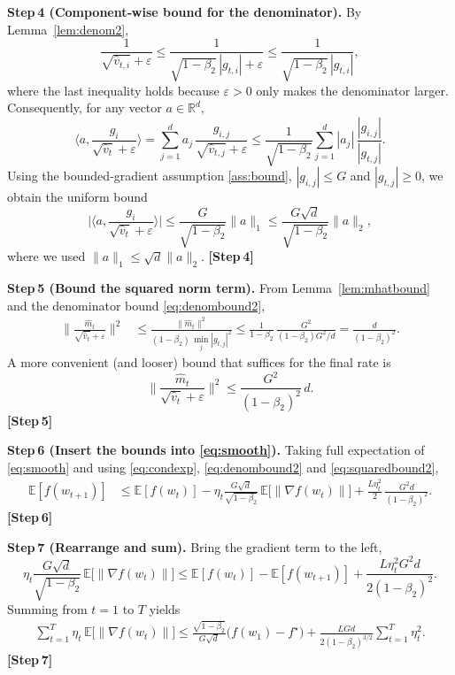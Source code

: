 \documentclass{article}
\begin{document}
\noindent\textbf{Step 4 (Component‑wise bound for the denominator).}  
By Lemma~\ref{lem:denom2},
\[
\frac{1}{\sqrt{\hat v_{t,i}}+\varepsilon}
\le \frac{1}{\sqrt{1-\beta_2}\,|g_{t,i}|+\varepsilon}
\le \frac{1}{\sqrt{1-\beta_2}\,|g_{t,i}|},
\]
where the last inequality holds because $\varepsilon>0$ only makes the
denominator larger.  Consequently, for any vector $a\in\mathbb{R}^d$,
\[
\Big\langle a,\frac{g_i}{\sqrt{\hat v_t}+\varepsilon}\Big\rangle
= \sum_{j=1}^{d} a_j\,
   \frac{g_{i,j}}{\sqrt{\hat v_{t,j}}+\varepsilon}
\le \frac{1}{\sqrt{1-\beta_2}}
   \sum_{j=1}^{d} |a_j|\,
   \frac{|g_{i,j}|}{|g_{t,j}|}.
\tag{4}\label{eq:denombound}
\]
Using the bounded‑gradient assumption \ref{ass:bound},
$|g_{i,j}|\le G$ and $|g_{t,j}|\ge 0$, we obtain the uniform bound
\[
\Big|\Big\langle a,\frac{g_i}{\sqrt{\hat v_t}+\varepsilon}\Big\rangle\Big|
\le \frac{G}{\sqrt{1-\beta_2}}\|a\|_{1}
\le \frac{G\sqrt{d}}{\sqrt{1-\beta_2}}\|a\|_{2},
\tag{5}\label{eq:denombound2}
\]
where we used $\|a\|_{1}\le\sqrt{d}\|a\|_{2}$.
\textbf{[Step 4]}

\noindent\textbf{Step 5 (Bound the squared norm term).}  
From Lemma~\ref{lem:mhatbound} and the denominator bound \eqref{eq:denombound2},
\begin{align}
\Big\|\frac{\hat m_t}{\sqrt{\hat v_t}+\varepsilon}\Big\|^{2}
&\le \frac{\|\hat m_t\|^{2}}{(1-\beta_2)\,\min_{j}|g_{t,j}|^{2}}
\le \frac{1}{1-\beta_2}\,\frac{G^{2}}{(1-\beta_2)G^{2}/d}
= \frac{d}{(1-\beta_2)^{2}} .
\tag{6}\label{eq:squaredbound}
\end{align}
A more convenient (and looser) bound that suffices for the final rate is
\[
\Big\|\frac{\hat m_t}{\sqrt{\hat v_t}+\varepsilon}\Big\|^{2}
\le \frac{G^{2}}{(1-\beta_2)^{2}}\,d .
\tag{7}\label{eq:squaredbound2}
\]
\textbf{[Step 5]}

\noindent\textbf{Step 6 (Insert the bounds into \eqref{eq:smooth}).}  
Taking full expectation of \eqref{eq:smooth} and using
\eqref{eq:condexp}, \eqref{eq:denombound2} and \eqref{eq:squaredbound2},
\begin{align}
\mathbb{E}[f(w_{t+1})]
&\le \mathbb{E}[f(w_t)]
   -\eta_t\frac{G\sqrt{d}}{\sqrt{1-\beta_2}}
      \,\mathbb{E}\!\big[\|\nabla f(w_t)\|\big]
   +\frac{L\eta_t^{2}}{2}\,
      \frac{G^{2}d}{(1-\beta_2)^{2}} .
\tag{8}\label{eq:recursion}
\end{align}
\textbf{[Step 6]}

\noindent\textbf{Step 7 (Rearrange and sum).}  
Bring the gradient term to the left,
\[
\eta_t\frac{G\sqrt{d}}{\sqrt{1-\beta_2}}
   \,\mathbb{E}\!\big[\|\nabla f(w_t)\|\big]
\le \mathbb{E}[f(w_t)]-\mathbb{E}[f(w_{t+1})]
   +\frac{L\eta_t^{2}G^{2}d}{2(1-\beta_2)^{2}} .
\]
Summing from $t=1$ to $T$ yields
\begin{align}
\sum_{t=1}^{T}\eta_t\,
   \mathbb{E}\!\big[\|\nabla f(w_t)\|\big]
\le \frac{\sqrt{1-\beta_2}}{G\sqrt{d}}\big(f(w_1)-f^\star\big)
   +\frac{L G d}{2(1-\beta_2)^{3/2}}
     \sum_{t=1}^{T}\eta_t^{2}.
\tag{9}\label{eq:sum}
\end{align}
\textbf{[Step 7]}
\end{document}
